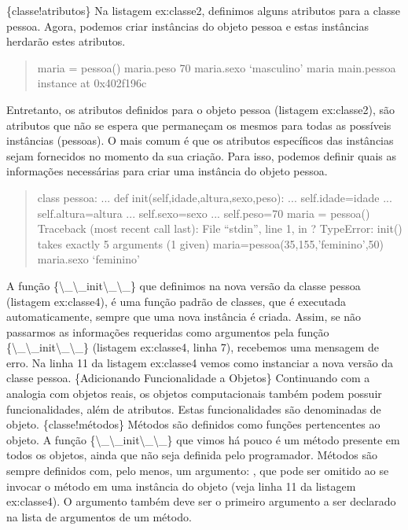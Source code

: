 \documentclass[a4paper,10pt,brazil]{sphinxmanual}
\begin{document}
\{classe!atributos\} Na listagem ex:classe2, definimos alguns
atributos para a classe pessoa. Agora, podemos criar instâncias do
objeto pessoa e estas instâncias herdarão estes atributos.
\begin{quote}

maria = pessoa() maria.peso 70 maria.sexo `masculino' maria
main.pessoa instance at 0x402f196c
\end{quote}

Entretanto, os atributos definidos para o objeto pessoa (listagem
ex:classe2), são atributos que não se espera que permaneçam os
mesmos para todas as possíveis instâncias (pessoas). O mais comum é
que os atributos específicos das instâncias sejam fornecidos no
momento da sua criação. Para isso, podemos definir quais as
informações necessárias para criar uma instância do objeto pessoa.
\begin{quote}

class pessoa: ... def init(self,idade,altura,sexo,peso): ...
self.idade=idade ... self.altura=altura ... self.sexo=sexo ...
self.peso=70 maria = pessoa() Traceback (most recent call last):
File ``stdin'', line 1, in ? TypeError: init() takes exactly 5
arguments (1 given) maria=pessoa(35,155,'feminino',50) maria.sexo
`feminino'
\end{quote}

A função \{\textbackslash{}\_\textbackslash{}\_init\textbackslash{}\_\textbackslash{}\_\} que definimos na nova versão da
classe pessoa (listagem ex:classe4), é uma função padrão de
classes, que é executada automaticamente, sempre que uma nova
instância é criada. Assim, se não passarmos as informações
requeridas como argumentos pela função \{\textbackslash{}\_\textbackslash{}\_init\textbackslash{}\_\textbackslash{}\_\}
(listagem ex:classe4, linha 7), recebemos uma mensagem de erro. Na
linha 11 da listagem ex:classe4 vemos como instanciar a nova versão
da classe pessoa. \{Adicionando Funcionalidade a Objetos\}
Continuando com a analogia com objetos reais, os objetos
computacionais também podem possuir funcionalidades, além de
atributos. Estas funcionalidades são denominadas  de
objeto. \{classe!métodos\} Métodos são definidos como funções
pertencentes ao objeto. A função \{\textbackslash{}\_\textbackslash{}\_init\textbackslash{}\_\textbackslash{}\_\} que vimos
há pouco é um método presente em todos os objetos, ainda que não
seja definida pelo programador. Métodos são sempre definidos com,
pelo menos, um argumento: , que pode ser omitido ao se
invocar o método em uma instância do objeto (veja linha 11 da
listagem ex:classe4). O argumento  também deve ser o
primeiro argumento a ser declarado na lista de argumentos de um
método.
\end{document}
